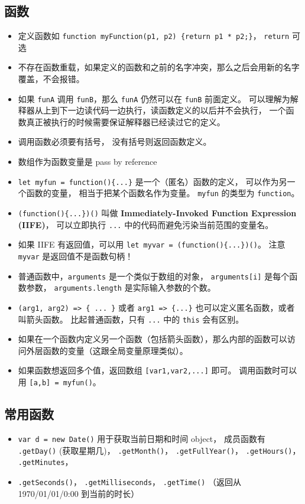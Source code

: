 \subsection{函数}
\begin{itemize}
\item 定义函数如 \verb`function myFunction(p1, p2) {return p1 * p2;}`， \verb`return` 可选
\item 不存在函数重载，如果定义的函数和之前的名字冲突，那么之后会用新的名字覆盖，不会报错。
\item 如果 \verb`funA` 调用 \verb`funB`，那么 \verb`funA` 仍然可以在 \verb`funB` 前面定义。 可以理解为解释器从上到下一边读代码一边执行，读函数定义的以后并不会执行， 一个函数真正被执行的时候需要保证解释器已经读过它的定义。
\item 调用函数必须要有括号， 没有括号则返回函数定义。
\item 数组作为函数变量是 pass by reference
\item \verb`let myfun = function(){...}` 是一个（匿名）函数的定义， 可以作为另一个函数的变量， 相当于把某个函数名作为变量。 \verb`myfun` 的类型为 \verb`function`。
\item \verb`(function(){...})()` 叫做 \textbf{Immediately-Invoked Function Expression (IIFE)}， 可以立即执行 \verb`...` 中的代码而避免污染当前范围的变量名。
\item 如果 IIFE 有返回值，可以用 \verb`let myvar = (function(){...})()`。 注意 \verb`myvar` 是返回值不是函数句柄！
\item 普通函数中，\verb`arguments` 是一个类似于数组的对象， \verb`arguments[i]` 是每个函数参数， \verb`arguments.length` 是实际输入参数的个数。
\item \verb`(arg1, arg2) => { ... }` 或者 \verb`arg1 => {...}` 也可以定义匿名函数，或者叫箭头函数。 比起普通函数，只有 \verb`...` 中的 \verb`this` 会有区别。
\item 如果在一个函数内定义另一个函数（包括箭头函数），那么内部的函数可以访问外层函数的变量（这跟全局变量原理类似）。
\item 如果函数想返回多个值，返回数组 \verb`[var1,var2,...]` 即可。 调用函数时可以用 \verb`[a,b] = myfun()`。
\end{itemize}

\subsection{常用函数}
\begin{itemize}
\item \verb`var d = new Date()` 用于获取当前日期和时间 object， 成员函数有 \verb`.getDay()` (获取星期几)， \verb`.getMonth()`， \verb`.getFullYear()`， \verb`.getHours()`， \verb`.getMinutes`，
\item \verb`.getSeconds()`， \verb`.getMilliseconds`， \verb`.getTime()` （返回从 1970/01/01/0:00 到当前的时长）
\end{itemize}

